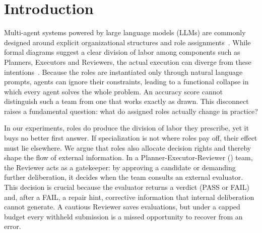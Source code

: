 \section{Introduction}
\label{sec:intro}

Multi-agent systems powered by large language models (LLMs) are commonly
designed around explicit organizational structures and role
assignments~\cite{hong2024metagpt,qian2024chatdev,wu2024autogen}. While
formal diagrams suggest a clear division of labor among components such as
Planners, Executors and Reviewers, the actual execution can diverge from
these intentions~\cite{cemri2025why}. Because the roles are instantiated
only through natural language prompts, agents can ignore their constraints,
leading to a functional collapse in which every agent solves the whole
problem. An accuracy score cannot distinguish such a team from one that
works exactly as drawn. This disconnect raises a fundamental question: what
do assigned roles actually change in practice?

In our experiments, roles do produce the division of labor they prescribe,
yet it buys no better first answer. If specialization is not where roles
pay off, their effect must lie elsewhere. We argue that roles also allocate
decision rights and thereby shape the flow of external information. In a
Planner-Executor-Reviewer (\PER{}) team, the Reviewer acts as a gatekeeper:
by approving a candidate or demanding further deliberation, it decides when
the team consults an external evaluator. This decision is crucial because
the evaluator returns a verdict (PASS or FAIL) and,
after a FAIL, a repair hint, corrective information that internal
deliberation cannot generate. A cautious Reviewer saves evaluations, but under a capped budget
every withheld submission is a missed opportunity to recover from an
error.

